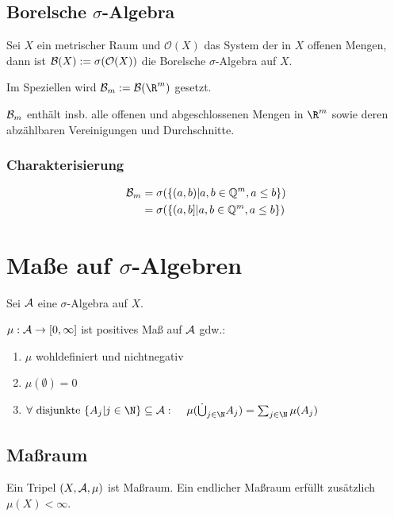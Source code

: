 \subsection*{Borelsche $\sigma$-Algebra}

Sei $X$ ein metrischer Raum und $\mathcal{O}(X)$ das System der in $X$ offenen Mengen, dann ist $\mathcal{B}(X) := \sigma(\mathcal{O}(X))$ die Borelsche $\sigma$-Algebra auf $X$.

Im Speziellen wird $\B_m := \B(\R^m)$ gesetzt.

$\mathcal{B}_m$ enthält insb. alle offenen und abgeschlossenen Mengen in $\R^m$ sowie deren abzählbaren Vereinigungen und Durchschnitte.

\subsubsection*{Charakterisierung}

\vspace*{-4mm}
\begin{align*}
	\mathcal{B}_m &= \sigma(\{(a, b) | a, b \in \mathbb{Q}^m, a \leq b\}) \\
	              &= \sigma(\{(a, b] | a, b \in \mathbb{Q}^m, a \leq b\})
\end{align*}

\section*{Maße auf $\sigma$-Algebren}

Sei $\mathcal{A}$ eine $\sigma$-Algebra auf $X$.

$\mu : \mathcal{A} \to [0, \infty]$ ist positives Maß auf $\mathcal{A}$ gdw.:

\begin{enumerate}[label=(\alph*)]
	\item $\mu$ wohldefiniert und nichtnegativ
	\item $\mu(\emptyset) = 0$
	\item $\forall \text{ disjunkte } \{A_j | j \in \N\} \subseteq \A :\\ \hspace*{4mm} \mu(\dot\bigcup_{j\in \N} A_j) = \sum_{j\in \N} \mu(A_j)$
\end{enumerate}

\subsection*{Maßraum}

Ein Tripel $(X, \mathcal{A}, \mu)$ ist Maßraum. Ein endlicher Maßraum erfüllt zusätzlich $\mu(X) < \infty$.

